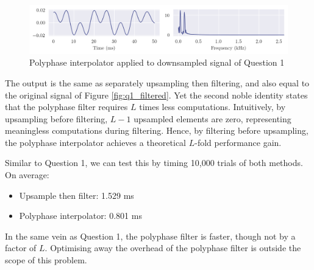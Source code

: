 \begin{figure}[ht]
    \centering
    \includegraphics[width=\textwidth]{images/q2_polyinterpolate.png}
    \caption{Polyphase interpolator applied to downsampled signal of Question 1}
    \label{fig:q2_polyinterpolate}
\end{figure}

\newpage

The output is the same as separately upsampling then filtering, and also equal to the original signal of Figure \ref{fig:q1_filtered}. Yet the second noble identity states that the polyphase filter requires $L$ times less computations. Intuitively, by upsampling before filtering, $L-1$ upsampled elements are zero, representing meaningless computations during filtering. Hence, by filtering before upsampling, the polyphase interpolator achieves a theoretical $L$-fold performance gain.

Similar to Question 1, we can test this by timing 10,000 trials of both methods. On average:
\begin{itemize}
    \item Upsample then filter: 1.529 ms
    \item Polyphase interpolator: 0.801 ms
\end{itemize}
In the same vein as Question 1, the polyphase filter is faster, though not by a factor of $L$. Optimising away the overhead of the polyphase filter is outside the scope of this problem.
